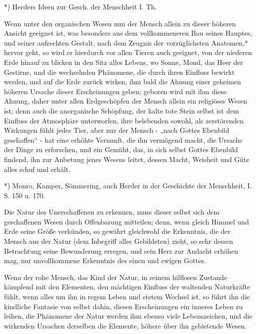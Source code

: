 \documentclass[a4paper, 11pt, oneside, polutonikogreek, german]{article}
\begin{document}
*) Herders Ideen zur Gesch. der Menschheit I. Th.

Wenn unter den organischen Wesen nun der Mensch allein zu dieser höheren Ansicht geeignet ist, was besonders aus dem vollkommeneren Bau seines Hauptes, und seiner aufrechten Gestalt, nach dem Zeugnis der vorzüglichsten Anatomen,* hervor geht, so wird er hierdurch vor allen Tieren auch geeignet, von der niederen Erde hinauf zu blicken in den Sitz alles Lebens, wo Sonne, Mond, das Heer der Gestirne, und die wechselnden Phänomene, die durch ihren Einfluss bewirkt werden, und auf die Erde zurück wirken, ihm bald die Ahnung einer geheimen höheren Ursache dieser Erscheinungen geben; geboren wird mit ihm diese Ahnung, daher unter allen Erdgeschöpfen der Mensch allein ein religiöses Wesen ist; denn auch die anorganische Schöpfung, der kalte tote Stein selbst ist dem Einfluss der Atmosphäre unterworfen, ihre belebenden sowohl, als zerstörenden Wirkungen fühlt jedes Tier, aber nur der Mensch - „nach Gottes Ebenbild geschaffen“ - hat eine erhöhte Vernunft, die ihn vermögend macht, die Ursache der Dinge zu erforschen, und ein Gemüht, das, in sich selbst Gottes Ebenbild findend, ihn zur Anbetung jenes Wesens leitet, dessen Macht, Weisheit und Güte alles schuf und erhält.

*) Monro, Kamper, Sömmering, auch Herder in der Geschichte der Menschheit, I. S. 150 u. 170.

Die Natur des Unerschaffenen zu erkennen, muss dieser selbst sich dem geschaffenen Wesen durch Offenbarung mitteilen; denn, wenn gleich Himmel und Erde seine Größe verkünden, so gewährt gleichwohl die Erkenntnis, die der Mensch aus der Natur (dem Inbegriff alles Gebildeten) zieht, so sehr dessen Betrachtung seine Bewunderung erregen, und sein Herz zur Andacht erhöhen mag, nur unvollkommene Erkenntnis des einen und ewigen Gottes.

Wenn der rohe Mensch, das Kind der Natur, in seinem hilflosen Zustande kämpfend mit den Elementen, den mächtigen Einfluss der waltenden Naturkräfte fühlt, wenn alles um ihn in regem Leben und stetem Wechsel ist, so führt ihn die kindliche Fantasie von selbst dahin, diesen Erscheinungen ein inneres Leben zu leihen, die Phänomene der Natur werden ihm ebenso viele Lebenszeichen, und die wirkenden Ursachen derselben die Elemente, höhere über ihn gebietende Wesen.
\end{document}
